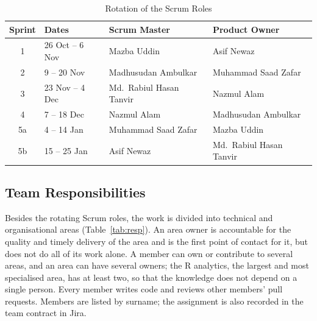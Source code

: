 \documentclass[conference]{IEEEtran}
\begin{document}
\begin{table}[!t]
\caption{Rotation of the Scrum Roles}
\label{tab:roles}
\centering
\scriptsize
\setlength{\tabcolsep}{4pt}
\begin{tabular}{@{}clll@{}}
\toprule
Sprint & Dates & Scrum Master & Product Owner \\
\midrule
1  & 26 Oct -- 6 Nov  & Mazba Uddin              & Asif Newaz \\
2  & 9 -- 20 Nov      & Madhusudan Ambulkar      & Muhammad Saad Zafar \\
3  & 23 Nov -- 4 Dec  & Md.\ Rabiul Hasan Tanvir & Nazmul Alam \\
4  & 7 -- 18 Dec      & Nazmul Alam              & Madhusudan Ambulkar \\
5a & 4 -- 14 Jan      & Muhammad Saad Zafar      & Mazba Uddin \\
5b & 15 -- 25 Jan     & Asif Newaz               & Md.\ Rabiul Hasan Tanvir \\
\bottomrule
\end{tabular}
\end{table}

\subsection{Team Responsibilities}
\label{sec:responsibilities}
Besides the rotating Scrum roles, the work is divided into technical and organisational areas (Table~\ref{tab:resp}). An area owner is accountable for the quality and timely delivery of the area and is the first point of contact for it, but does not do all of its work alone. A member can own or contribute to several areas, and an area can have several owners; the R analytics, the largest and most specialised area, has at least two, so that the knowledge does not depend on a single person. Every member writes code and reviews other members' pull requests. Members are listed by surname; the assignment is also recorded in the team contract in Jira.
\end{document}
